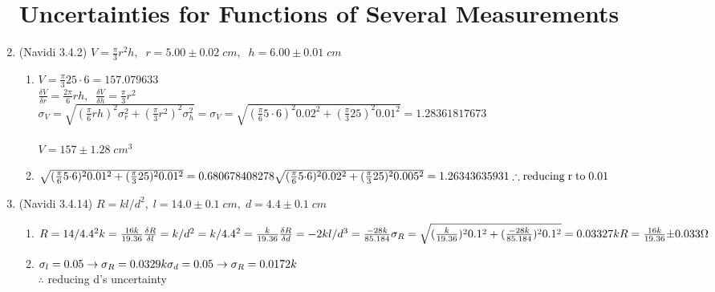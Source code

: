 \documentclass[11pt]{article}
\begin{document}
\begin{enumerate}
\section*{Uncertainties for Functions of Several Measurements}
\item (Navidi 3.4.2) $V=\frac{\pi}{3}r^{2}h, \;\; r=5.00{\pm}0.02\;cm, \;\; h=6.00{\pm}0.01\;cm$ %
\begin{enumerate}
        \item $V=\frac{\pi}{3}25{\cdot}6 =157.079633$ \\ 
        $\frac{\delta V}{\delta r}=\frac{2\pi}{6}rh, \;\; \frac{\delta V}{\delta h}=\frac{\pi}{3}r^{2}$ \\
        $\sigma_{V}=\sqrt{(\frac{\pi}{6}rh)^{2}\sigma_{r}^{2}+(\frac{\pi}{3}r^{2})^{2}\sigma_{h}^{2}}
        =\sigma_{V}=\sqrt{(\frac{\pi}{6}5{\cdot}6)^{2}0.02^{2}+(\frac{\pi}{3}25)^{2}0.01^{2}}=1.28361817673$ \\ \\ 
        $V = 157{\pm}1.28\;cm^{3}$ \\

        \item 
        $\sqrt{(\frac{\pi}{6}5{\cdot}6)^{2}0.01^{2}+(\frac{\pi}{3}25)^{2}0.01^{2}}=0.680678408278 \\ 
        \sqrt{(\frac{\pi}{6}5{\cdot}6)^{2}0.02^{2}+(\frac{\pi}{3}25)^{2}0.005^{2}}=1.26343635931 \\ 
        \therefore \mathrm{reducing\;r\;to\;0.01}$ 
\end{enumerate}

\item (Navidi 3.4.14) $R=kl/d^{2}, \; l=14.0{\pm}0.1\;cm, \; d=4.4{\pm}0.1\;cm$%
\begin{enumerate}
        \item $R=14/4.4^2k=\frac{16k}{19.36} \\
                \frac{\delta R}{\delta l} = k/d^2 = k/4.4^2=\frac{k}{19.36}\\
                \frac{\delta R}{\delta d} = -2kl/d^3 = \frac{-28k}{85.184}\\
                \sigma_{R}=\sqrt{(\frac{k}{19.36})^{2}0.1^{2}+(\frac{-28k}{85.184})^{2}0.1^{2}} = 0.03327k \\\\
                R = \frac{16k}{19.36}{\pm}0.033{\Omega}$ \\
        \item $\sigma_{l} = 0.05 \rightarrow \sigma_{R}=0.0329k \\
                \sigma_{d} = 0.05 \rightarrow \sigma_{R}=0.0172k$ \\
                $\therefore$ reducing d's uncertainty
\end{enumerate}

\end{enumerate}
\end{document}
